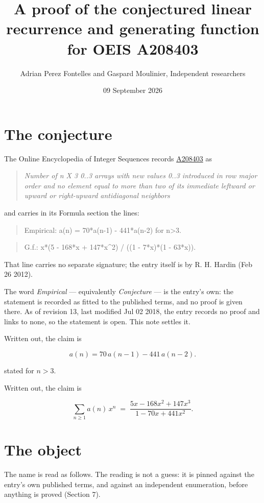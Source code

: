 \documentclass[11pt]{article}
\title{A proof of the conjectured linear recurrence and generating function for OEIS A208403}
\author{Adrian Perez Fontelles and Gaspard Moulinier, Independent researchers}
\date{09 September 2026}
\theoremstyle{definition}
\begin{document}
\maketitle
\section{The conjecture}

The Online Encyclopedia of Integer Sequences records \href{https://oeis.org/A208403}{A208403} as

\begin{quote}\itshape Number of n X 3 0..3 arrays with new values 0..3 introduced in row major order and no element equal to more than two of its immediate leftward or upward or right-upward antidiagonal neighbors\end{quote}

and carries in its Formula section the lines:

\begin{quote}\ttfamily Empirical: a(n) = 70*a(n-1) - 441*a(n-2) for n>3.\end{quote}

\begin{quote}\ttfamily G.f.: x*(5 - 168*x + 147*x\textasciicircum{}2) / ((1 - 7*x)*(1 - 63*x)).\end{quote}

That line carries no separate signature; the entry itself is by R. H. Hardin (Feb 26 2012).

The word {\itshape Empirical} --- equivalently {\itshape Conjecture} --- is the entry's own: the statement is recorded as fitted to the published terms, and no proof is given there. As of revision 13, last modified Jul 02 2018, the entry records no proof and links to none, so the statement is open. This note settles it.

Written out, the claim is

\[a(n) = 70\,a(n-1) - 441\,a(n-2).\]

stated for $n > 3$.

Written out, the claim is

\[\sum_{n \ge 1} a(n)\,x^n \;=\; \frac{5x - 168x^{2} + 147x^{3}}{1 - 70x + 441x^{2}}.\]

\section{The object}

The name is read as follows. The reading is not a guess: it is pinned against the entry's own published terms, and against an independent enumeration, before anything is proved (Section 7).
\end{document}
